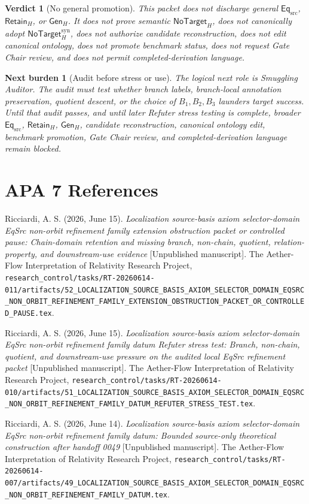 \documentclass[11pt]{article}
\newcommand{\EqSrc}{\mathsf{Eq}_{\mathrm{src}}}
\newcommand{\RetainH}{\mathsf{Retain}_{H}}
\newcommand{\GenH}{\mathsf{Gen}_{H}}
\newcommand{\NoTargetH}{\mathsf{NoTarget}_{H}}
\newcommand{\NoTargetSyn}{\mathsf{NoTarget}_{H}^{\mathrm{syn}}}
\newtheorem{verdict}{Verdict}
\newtheorem{nextburden}{Next burden}
\begin{document}
\begin{verdict}[No general promotion]
This packet does not discharge general \(\EqSrc\), \(\RetainH\), or
\(\GenH\). It does not prove semantic \(\NoTargetH\), does not
canonically adopt \(\NoTargetSyn\), does not authorize candidate
reconstruction, does not edit canonical ontology, does not promote
benchmark status, does not request Gate Chair review, and does not permit
completed-derivation language.
\end{verdict}

\begin{nextburden}[Audit before stress or use]
The logical next role is Smuggling Auditor. The audit must test whether
branch labels, branch-local annotation preservation, quotient descent, or
the choice of \(B_{1},B_{2},B_{3}\) launders target success. Until that
audit passes, and until later Refuter stress testing is complete, broader
\(\EqSrc\), \(\RetainH\), \(\GenH\), candidate reconstruction, canonical
ontology edit, benchmark promotion, Gate Chair review, and
completed-derivation language remain blocked.
\end{nextburden}

\section*{APA 7 References}

Ricciardi, A. S. (2026, June 15). \emph{Localization source-basis axiom
selector-domain EqSrc non-orbit refinement family extension obstruction
packet or controlled pause: Chain-domain retention and missing branch,
non-chain, quotient, relation-property, and downstream-use evidence}
[Unpublished manuscript]. The Aether-Flow Interpretation of Relativity
Research Project,
\texttt{research\_control/tasks/RT-20260614-011/artifacts/52\_LOCALIZATION\_SOURCE\_BASIS\_AXIOM\_SELECTOR\_DOMAIN\_EQSRC\_NON\_ORBIT\_REFINEMENT\_FAMILY\_EXTENSION\_OBSTRUCTION\_PACKET\_OR\_CONTROLLED\_PAUSE.tex}.

Ricciardi, A. S. (2026, June 15). \emph{Localization source-basis axiom
selector-domain EqSrc non-orbit refinement family datum Refuter stress
test: Branch, non-chain, quotient, and downstream-use pressure on the
audited local EqSrc refinement packet} [Unpublished manuscript]. The
Aether-Flow Interpretation of Relativity Research Project,
\texttt{research\_control/tasks/RT-20260614-010/artifacts/51\_LOCALIZATION\_SOURCE\_BASIS\_AXIOM\_SELECTOR\_DOMAIN\_EQSRC\_NON\_ORBIT\_REFINEMENT\_FAMILY\_DATUM\_REFUTER\_STRESS\_TEST.tex}.

Ricciardi, A. S. (2026, June 14). \emph{Localization source-basis axiom
selector-domain EqSrc non-orbit refinement family datum: Bounded
source-only theoretical construction after handoff 0049} [Unpublished
manuscript]. The Aether-Flow Interpretation of Relativity Research
Project,
\texttt{research\_control/tasks/RT-20260614-007/artifacts/49\_LOCALIZATION\_SOURCE\_BASIS\_AXIOM\_SELECTOR\_DOMAIN\_EQSRC\_NON\_ORBIT\_REFINEMENT\_FAMILY\_DATUM.tex}.
\end{document}
